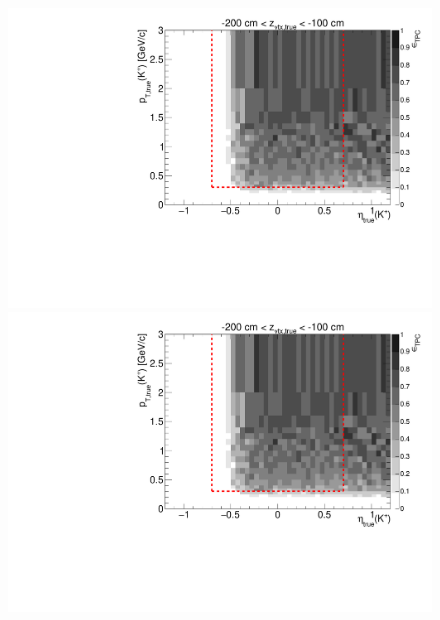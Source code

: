 \begin{figure}[hb]
{  \includegraphics[width=\linewidth,page=16]{graphics/eff/Eff2D_TPC_kaon_Plus.pdf}\\
  \includegraphics[width=\linewidth,page=18]{graphics/eff/Eff2D_TPC_kaon_Plus.pdf}
}%
\end{figure}














